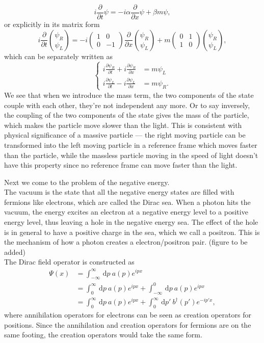 \documentclass{article}
\newcommand{\be}{\begin{equation}}
\newcommand{\ee}{\end{equation}}
\newcommand{\ba}{\begin{array}}
\newcommand{\ea}{\end{array}}
\newcommand{\dif}{\,\mathrm{d}}
\newcommand{\p}{\partial}
\renewcommand{\1}{\left}
\renewcommand{\2}{\right}
\newcommand{\al}{\alpha}
\newcommand{\bet}{\beta}
\begin{document}
\be
i\frac{\p}{\p t}\psi=-i\al\frac{\p}{\p x}\psi+\bet m\psi,
\ee
or explicitly in its matrix form
\be
i\frac{\p}{\p t}\binom{\psi_R}{\psi_L}=-i\1(\ba{cc}1&0\\0&-1\ea\2)\frac{\p}{\p x}\binom{\psi_R}{\psi_L}+m\1(\ba{cc}0&1\\1&0\ea\2)\binom{\psi_R}{\psi_L},
\ee
which can be separately written as 
\be\1\{\begin{split}
i\frac{\p\psi_R}{\p t}+i\frac{\p\psi_R}{\p x}&=m\psi_L\\
i\frac{\p\psi_L}{\p t}-i\frac{\p\psi_L}{\p x}&=m\psi_R.
\end{split}\2.\ee
We see that when we introduce the mass term, the two components of the state couple with each other, they're not independent any more. Or to say inversely, the coupling of the two components of the state gives the mass of the particle, which makes the particle move slower than the light. This is consistent with physical significance of a massive particle --- the right moving particle can be transformed into the left moving particle in a reference frame which moves faster than the particle, while the massless particle moving in the speed of light doesn't have this property since no reference frame can move faster than the light. 

Next we come to the problem of the negative energy.\\
The vacuum is the state that all the negative energy states are filled with fermions like electrons, which are called the Dirac sea. When a photon hits the vacuum, the energy excites an electron at a negative energy level to a positive energy level, thus leaving a hole in the negative energy sea. The effect of the hole is in general to have a positive charge in the sea, which we call a positron. This is the mechanism of how a photon creates a electron/positron pair. (figure to be added)\\
The Dirac field operator is constructed as
\be\begin{split}
\Psi(x)&=\int_{-\infty}^{\infty}\dif p\ a(p) e^{ipx}\\
&=\int_{0}^{\infty}\dif p\ a(p) e^{ipx}+\int_{-\infty}^{0}\dif p\ a(p) e^{ipx}\\
&=\int_{0}^{\infty}\dif p\ a(p) e^{ipx}+\int^{\infty}_{0}\dif p'\ b^\dag(p') e^{-ip'x},
\end{split}\ee
where annihilation operators for electrons can be seen as creation operators for positions. Since the annihilation and creation operators for fermions are on the same footing, the creation operators would take the same form.
\end{document}
